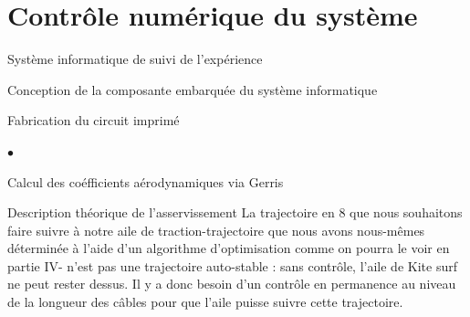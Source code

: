 \documentclass[a4paper,twoside,12pt]{article}
\newcounter{partie}
\newcounter{sous-partie}
\newenvironment{partie}[1]
{
\section{#1}
}
{

}
\newenvironment{sous-partie}[1]
{
\subsection{#1}
}
{

}
\newenvironment{sous-sous-partie}[1]
{
\subsubsection{#1}
}
{

}
\newenvironment{liste}
{
\vspace{0.2cm}
\begin{list}{$\bullet$\hspace{0.3cm}}{\leftmargin=1.4cm}
}
{
\end{list}
\vspace{0.2cm}
}
\begin{document}
\begin{partie}{Contrôle numérique du système}
\begin{sous-partie}{Système informatique de suivi de l'expérience}
\begin{sous-sous-partie}{Conception de la composante embarquée du système informatique}
\begin{paragraph}{Fabrication du circuit imprimé\vspace{0.3cm}\\}
\begin{liste}
\end{liste}
\end{paragraph}

\end{sous-sous-partie}

\end{sous-partie}



\begin{sous-partie}{Calcul des coéfficients aérodynamiques via Gerris}

\end{sous-partie}

\begin{sous-partie}{Description théorique de l'asservissement}
La trajectoire en 8 que nous souhaitons faire suivre à notre aile de traction-trajectoire que nous avons nous-mêmes déterminée à l'aide d'un algorithme d'optimisation comme on pourra le voir en partie IV- n'est pas une trajectoire auto-stable : sans contrôle, l'aile de Kite surf ne peut rester dessus. %
Il y a donc besoin d'un contrôle en permanence au niveau de la longueur des câbles pour que l'aile puisse suivre cette trajectoire. %


\end{sous-partie}
\end{partie}
\end{document}
